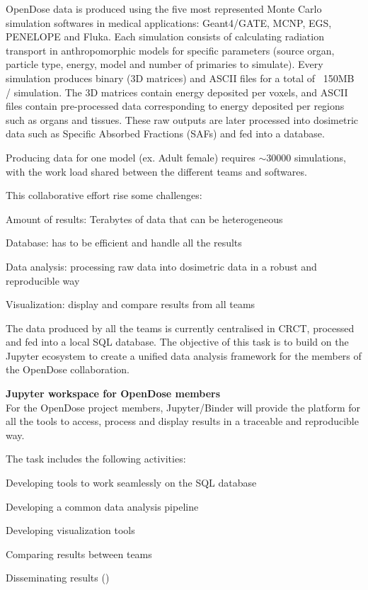 \begin{task}[
  title=OpenDose unified data analysis framework,
  id=opendose-analysis,
  lead=INSERM,
  PM=24,
  wphases={0-48},
  partners={INSERM}
]
  OpenDose data is produced using the five most represented Monte Carlo
  simulation softwares in medical applications: Geant4/GATE, MCNP, EGS,
  PENELOPE and Fluka. Each simulation consists of calculating radiation
  transport in anthropomorphic models  for specific parameters (source organ,
  particle type, energy, model and number of primaries to simulate).  Every
  simulation produces binary (3D matrices) and ASCII files for a total of
  ~150MB / simulation. The 3D matrices contain energy deposited per voxels, and
  ASCII files contain pre-processed data corresponding to energy deposited per
  regions such as organs and tissues. These raw outputs are later processed
  into dosimetric data such as Specific Absorbed Fractions (SAFs) and fed into
  a database.

  Producing data for one model (ex. Adult female) requires $\sim 30 000$
  simulations, with the work load shared between the different teams and
  softwares. 

  This collaborative effort rise some challenges:
  \begin{compactitem}
  \item Amount of results: Terabytes of data that can be heterogeneous
  \item Database: has to be efficient and handle all the results 
  \item Data analysis: processing raw data into dosimetric data in a robust and
  reproducible way
  \item Visualization: display and compare results from all teams
  \end{compactitem}


  The data produced by all the teams is currently centralised in CRCT,
  processed and fed into a local SQL database. 
  The objective of this task is to build on the Jupyter ecosystem to create a
  unified data analysis framework for the members of the OpenDose
  collaboration.

  \textbf{Jupyter workspace for OpenDose members}\\
  For the OpenDose project members, Jupyter/Binder will provide the platform
  for all the tools to access, process and display results in a traceable and
  reproducible way.

  The task includes the following activities:
  \begin{compactitem}
  \item Developing tools to work seamlessly on the SQL database
  \item Developing a common data analysis pipeline
  \item Developing visualization tools
  \item Comparing results between teams
  \item Disseminating results
    ()
  \end{compactitem}


\end{task}
